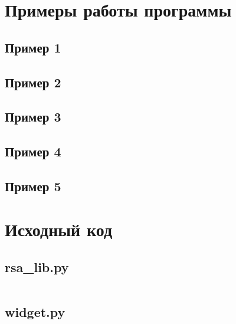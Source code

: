\documentclass[utf8x, 14pt, bold, times]{G7-32} %
\begin{document}
\chapter{Примеры работы программы}

\section{Пример 1}



\section{Пример 2}



\section{Пример 3}



\section{Пример 4}



\section{Пример 5}



\chapter{Исходный код}

\section{rsa\_lib.py}

\inputminted[fontsize=\footnotesize, breaklines]{python}{../../src/rsa_lib.py}

\section{widget.py}

\inputminted[fontsize=\footnotesize, breaklines]{python}{../../src/widget.py}
\end{document}
